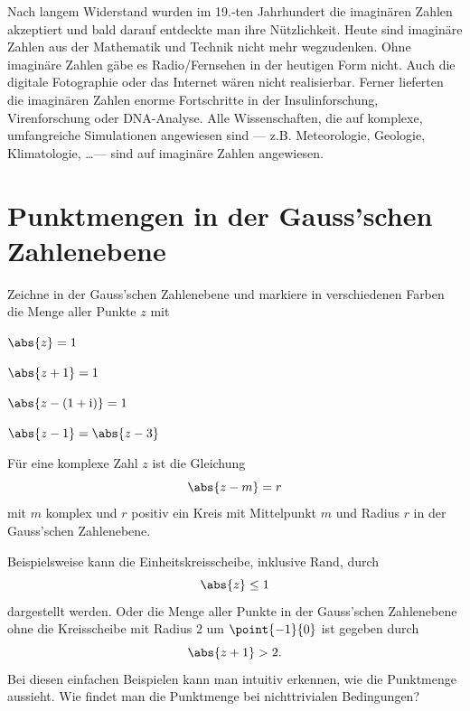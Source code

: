 \documentclass[%
11pt,%
twoside,%
titlepage,%
german,%
headsepline%
]{scrartcl}
\begin{document}
Nach langem Widerstand wurden im 19.-ten Jahrhundert die imaginären Zahlen akzeptiert und bald darauf entdeckte man ihre N\"utzlichkeit. Heute sind imagin\"are Zahlen aus der Mathematik und Technik nicht mehr wegzudenken. Ohne imagin\"are Zahlen gäbe es Radio/Fernsehen in der heutigen Form nicht. Auch die digitale Fotographie oder das Internet w\"aren nicht realisierbar. Ferner lieferten die imagin\"aren Zahlen enorme Fortschritte in der Insulinforschung, Virenforschung oder DNA-Analyse. Alle Wissenschaften, die auf komplexe, umfangreiche Simulationen angewiesen sind --- z.B. Meteorologie, Geologie, Klimatologie, \dots --- sind auf imaginäre Zahlen angewiesen.

\section{Punktmengen in der Gauss'schen Zahlenebene}

\begin{ueb}[Abstände]
Zeichne in der Gauss'schen Zahlenebene und markiere in verschiedenen Farben die Menge aller Punkte $z$ mit

\begin{minipage}{3.5cm}
\begin{enumeratea}
\item $\abs{z}=1$
\item $\abs{z+1}=1$
\end{enumeratea}
\end{minipage}
\begin{minipage}{3.5cm}
\begin{enumeratea}
\setcounter{enumi}{2}
\item $\abs{z-(1+\mathrm{i})}=1$
\item $\abs{z-1}=\abs{z-3}$
\end{enumeratea}
\end{minipage}
\end{ueb}

\begin{bem}
F\"ur eine komplexe Zahl $z$ ist die Gleichung
$$\abs{z-m}=r$$
mit $m$ komplex und $r$ positiv ein Kreis mit Mittelpunkt $m$ und Radius $r$ in der Gauss'\-schen Zahlenebene.
\end{bem}

Beispielsweise kann die Einheitskreisscheibe, inklusive Rand, durch
$$\abs{z}\leq 1$$
dargestellt werden. Oder die Menge aller Punkte in der Gauss'\-schen Zahlenebene ohne die Kreisscheibe mit Radius $2$ um $\point{-1}{0}$ ist gegeben durch
$$\abs{z+1}>2.$$
Bei diesen einfachen Beispielen kann man intuitiv erkennen, wie die Punktmenge aussieht. Wie findet man die Punktmenge bei nichttrivialen Bedingungen?
\end{document}
